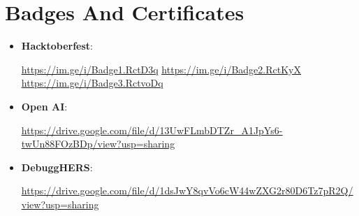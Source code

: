 \documentclass[letterpaper,11pt]{article}
\newcommand{\resumeItem}[1]{
  \item\small{
    {#1 \vspace{-2pt}}
  }
}
\newcommand{\resumeItemListStart}{\begin{itemize}}
\newcommand{\resumeItemListEnd}{\end{itemize}\vspace{-5pt}}
\begin{document}
\section{Badges And Certificates}
\resumeItemListStart
            \resumeItem{\textbf{Hacktoberfest}{:}} 
            \href{https://im.ge/i/Badge1.RctD3q}
           {{\underline{https://im.ge/i/Badge1.RctD3q}}}\newline
           \href{https://im.ge/i/Badge2.RctKyX}
           {{\underline{https://im.ge/i/Badge2.RctKyX}}}\newline
           \href{https://im.ge/i/Badge3.RctvoD}
           {{\underline{https://im.ge/i/Badge3.RctvoDq}}}
           
            \resumeItem{\textbf{Open AI}{:}}
            \href{https://drive.google.com/file/d/13UwFLmbDTZr_A1JpYs6-twUn88FOzBDp/view?usp=sharing}
             {\underline{https://drive.google.com/file/d/13UwFLmbDTZr_A1JpYs6-twUn88FOzBDp/view?usp=sharing}}
           
            \resumeItem{\textbf{DebuggHERS}{:}}
             \href{https://drive.google.com/file/d/1dsJwY8qvVo6cW44wZXG2r80D6Tz7pR2Q/view?usp=sharing}
           {{\underline{https://drive.google.com/file/d/1dsJwY8qvVo6cW44wZXG2r80D6Tz7pR2Q/view?usp=sharing}}}
    
\resumeItemListEnd

\end{document}
